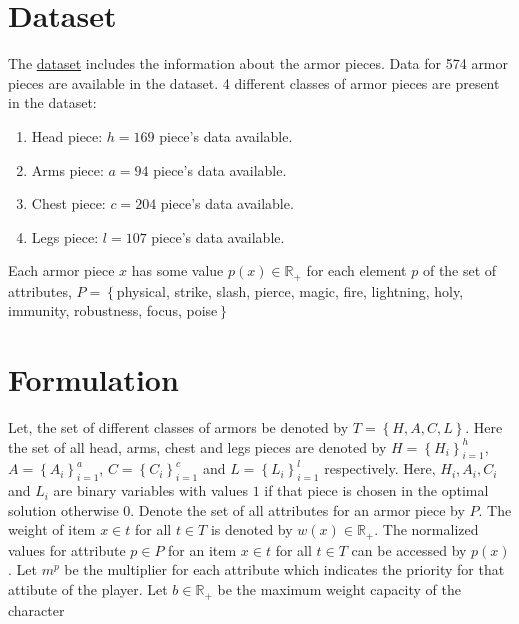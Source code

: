 \documentclass[10pt]{article}
\newcommand{\cbrace}[1]{\left\lbrace #1 \right\rbrace}
\begin{document}
    \section{Dataset}
    The \href{https://github.com/oureuphoriant/Elden_Ring_Armor_Calc}{dataset}
    includes the information about the armor pieces. 
    Data for 574 armor pieces are available in the dataset. 
    4 different classes of armor pieces are present in the dataset: 
    \begin{enumerate}
        \item Head piece: $h = 169$ piece's data available.
        \item Arms piece: $a = 94$ piece's data available.
        \item Chest piece: $c = 204$ piece's data available.
        \item Legs piece: $l = 107$ piece's data available.
    \end{enumerate}

    Each armor piece $x$ has some value $p(x) \in \mathbb{R}_+$ for each element $p$ of the set of attributes, $P = \left\lbrace \right.$physical, 
    strike, slash, pierce, magic, fire, lightning, holy, immunity, robustness, focus, poise$\left.\right\rbrace$
    



    \section{Formulation}
    Let, the set of different classes of armors be denoted by $T = \cbrace{H, A, C, L}$. Here the set of all head, arms,
    chest and legs pieces are denoted by $H = \cbrace{H_i}_{i=1}^h$, $A = \cbrace{A_i}_{i=1}^a$, $C =
    \cbrace{C_i}_{i=1}^c$ and $L = \cbrace{L_i}_{i=1}^l$ respectively. Here, $H_i, A_i, C_i$ and $L_i$ are binary
    variables with values $1$ if that piece is chosen in the optimal solution otherwise $0$. Denote the set of all
    attributes for an armor piece by $P$. The weight of item $x \in t$ for all $t \in T$ is denoted by $w(x) \in
    \mathbb{R}_+$. The normalized values for attribute $p \in P$ for an item $x \in t$ for all $t \in T$ can be accessed
    by $p(x)$. Let $m^p$ be the multiplier for each attribute which indicates the priority for that attibute of the
    player. Let $b \in \mathbb{R}_+$ be the maximum weight capacity of the character
\end{document}
